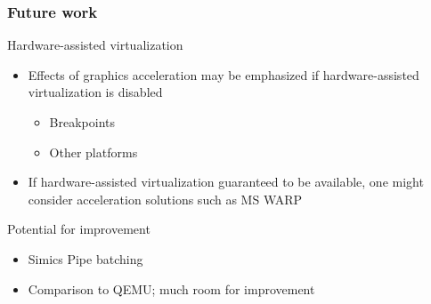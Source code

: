 
\begin{frame}

\frametitle{Future work}

\begin{block}{Hardware-assisted virtualization}
	\begin{itemize}
		\item Effects of graphics acceleration may be emphasized if hardware-assisted virtualization is disabled
		\begin{itemize}
			\item Breakpoints
			\item Other platforms
		\end{itemize}
		\item If hardware-assisted virtualization guaranteed to be available, one might consider acceleration solutions such as MS WARP
	\end{itemize}
\end{block}

\begin{block}{Potential for improvement}
	\begin{itemize}
		\item Simics Pipe batching
		\item Comparison to QEMU; much room for improvement
	\end{itemize}
\end{block}

\end{frame}
